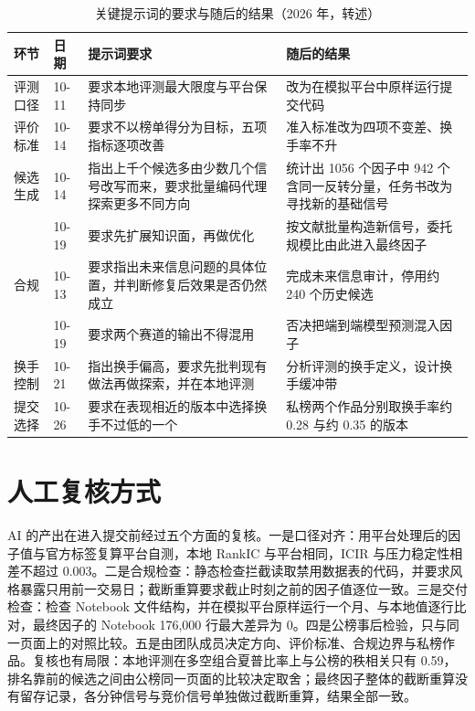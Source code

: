 \documentclass[UTF8,a4paper,zihao=-4,fontset=none]{ctexart}
\newcommand{\tablesetup}{\small\linespread{1.05}\selectfont\renewcommand{\arraystretch}{1.18}}
\begin{document}
\begin{table}[!htbp]
\caption{关键提示词的要求与随后的结果（2026 年，转述）}
\centering
{\tablesetup
\begin{tabularx}{\textwidth}{@{}P{1.6cm}P{1.0cm}P{6.3cm}L@{}}
\toprule
环节 & 日期 & 提示词要求 & 随后的结果\\
\midrule
评测口径 & 10-11 & 要求本地评测最大限度与平台保持同步 & 改为在模拟平台中原样运行提交代码\\
评价标准 & 10-14 & 要求不以榜单得分为目标，五项指标逐项改善 & 准入标准改为四项不变差、换手率不升\\
\midrule
候选生成 & 10-14 & 指出上千个候选多由少数几个信号改写而来，要求批量编码代理探索更多不同方向 & 统计出 1056 个因子中 942 个含同一反转分量，任务书改为寻找新的基础信号\\
 & 10-19 & 要求先扩展知识面，再做优化 & 按文献批量构造新信号，委托规模比由此进入最终因子\\
\midrule
合规 & 10-13 & 要求指出未来信息问题的具体位置，并判断修复后效果是否仍然成立 & 完成未来信息审计，停用约 240 个历史候选\\
 & 10-19 & 要求两个赛道的输出不得混用 & 否决把端到端模型预测混入因子\\
\midrule
换手控制 & 10-21 & 指出换手偏高，要求先批判现有做法再做探索，并在本地评测 & 分析评测的换手定义，设计换手缓冲带\\
提交选择 & 10-26 & 要求在表现相近的版本中选择换手不过低的一个 & 私榜两个作品分别取换手率约 0.28 与约 0.35 的版本\\
\bottomrule
\end{tabularx}}
\end{table}

\section{人工复核方式}

AI 的产出在进入提交前经过五个方面的复核。一是口径对齐：用平台处理后的因子值与官方标签复算平台自测，本地 RankIC 与平台相同，ICIR 与压力稳定性相差不超过 0.003。二是合规检查：静态检查拦截读取禁用数据表的代码，并要求风格暴露只用前一交易日；截断重算要求截止时刻之前的因子值逐位一致。三是交付检查：检查 Notebook 文件结构，并在模拟平台原样运行一个月、与本地值逐行比对，最终因子的 Notebook 176,000 行最大差异为 0。四是公榜事后检验，只与同一页面上的对照比较。五是由团队成员决定方向、评价标准、合规边界与私榜作品。复核也有局限：本地评测在多空组合夏普比率上与公榜的秩相关只有 0.59，排名靠前的候选之间由公榜同一页面的比较决定取舍；最终因子整体的截断重算没有留存记录，各分钟信号与竞价信号单独做过截断重算，结果全部一致。
\end{document}
